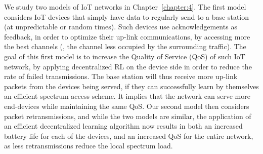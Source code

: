 %
We study two models of IoT networks in Chapter~\ref{chapter:4}.
The first model considers IoT devices that simply have data to regularly send to a base station (at unpredictable or random times).
Such devices use acknowledgements as feedback, in order to optimize their up-link communications, by accessing more the best channels (\ie, the channel less occupied by the surrounding traffic).
The goal of this first model is to increase the Quality of Service (QoS) of such IoT network, by applying decentralized RL on the device side in order to reduce the rate of failed transmissions.
The base station will thus receive more up-link packets from the devices being served, if they can successfully learn by themselves an efficient spectrum access scheme.
It implies that the network can serve more end-devices while maintaining the same QoS.
%
Our second model then considers packet retransmissions, and while the two models are similar, the application of an efficient decentralized learning algorithm now results in both an increased battery life for each of the devices, and an increased QoS for the entire network, as less retransmissions reduce the local spectrum load.

